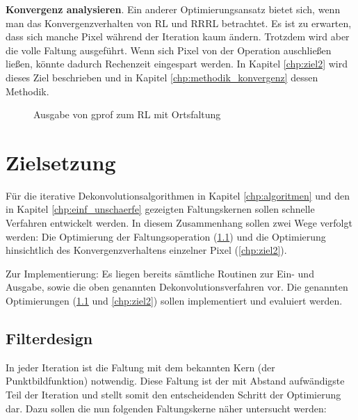 \documentclass[a4paper,12pt]{article}
\begin{document}
\textbf{Konvergenz analysieren}.
Ein anderer Optimierungsansatz bietet sich, wenn man das Konvergenzverhalten von
RL und RRRL betrachtet. Es ist zu erwarten, dass sich manche Pixel während der
Iteration kaum ändern. Trotzdem wird aber die volle Faltung ausgeführt. Wenn
sich Pixel von der Operation auschließen ließen, könnte dadurch Rechenzeit
eingespart werden. In Kapitel \ref{chp:ziel2} wird dieses Ziel beschrieben und
in Kapitel \ref{chp:methodik_konvergenz} dessen Methodik.


\begin{figure}[htbp]
\caption{Ausgabe von gprof zum RL mit Ortsfaltung}%
\label{figure_gprof}
\end{figure}


\section{Zielsetzung}
Für die iterative Dekonvolutionsalgorithmen in Kapitel \ref{chp:algoritmen} und
den in Kapitel \ref{chp:einf_unschaerfe} gezeigten Faltungskernen sollen
schnelle Verfahren entwickelt werden. In diesem Zusammenhang sollen zwei Wege
verfolgt werden: Die Optimierung der Faltungsoperation (\ref{chp:ziel1})
und die Optimierung hinsichtlich des Konvergenzverhaltens einzelner Pixel
(\ref{chp:ziel2}).

Zur Implementierung: Es liegen bereits sämtliche Routinen zur Ein- und
Ausgabe, sowie die oben genannten Dekonvolutionsverfahren vor. 
Die genannten Optimierungen (\ref{chp:ziel1} und \ref{chp:ziel2}) sollen implementiert
und evaluiert werden.

\subsection{Filterdesign} \label{chp:ziel1}

In jeder Iteration ist die Faltung mit dem bekannten Kern (der
Punktbildfunktion) notwendig. Diese Faltung ist der mit Abstand aufwändigste Teil 
der Iteration und stellt somit den entscheidenden Schritt der Optimierung
dar. Dazu sollen die nun folgenden Faltungskerne näher untersucht werden:
\end{document}
